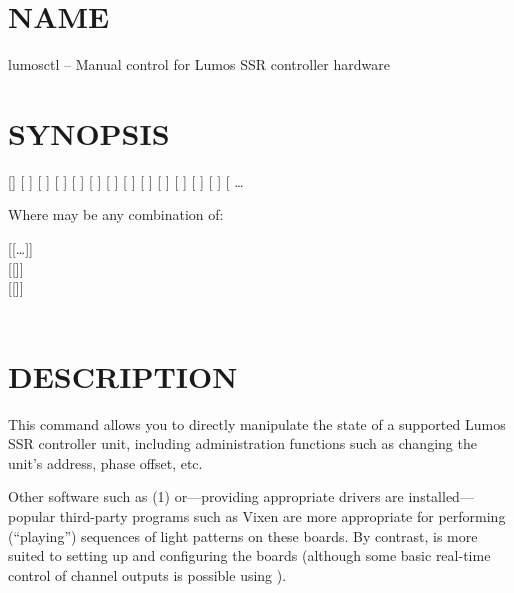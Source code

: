\section*{NAME}
lumosctl -- Manual control for Lumos SSR controller hardware
\section*{SYNOPSIS}
[]
[
]
[
]
[
]
[
]
[
]
[
]
[
]
[
]
[
]
[
]
[
]
[
]
[
\codetype{:}\codetype{:}\Var*{term\textnormal{]}}
\dots 


Where
may be any combination of:
\begin{center}


[[\codetype{,}\dots ]]
\\
[[]]
\\
[[]]
\\
\\
\end{center}
\section*{DESCRIPTION}


This command allows you to directly manipulate the state of a
supported Lumos
SSR controller unit, including administration functions
such as changing the unit's address, phase offset, etc.


Other software such as 
(1)
or---providing appropriate drivers are installed---popular
third-party programs such as Vixen are more appropriate for
performing (``playing'') sequences of light patterns on
these boards.  By contrast, 
is more suited to setting up and configuring the boards (although some
basic real-time control of channel outputs is possible using
).



